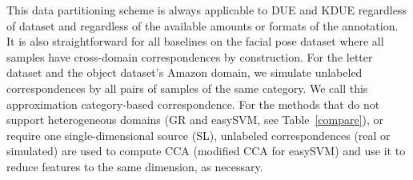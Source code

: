 \documentclass[10pt,twocolumn,letterpaper]{article}
\begin{document}

This data partitioning scheme is always applicable to DUE and KDUE regardless of dataset and regardless of the available amounts or formats of the annotation. It is also straightforward for all baselines on the facial pose dataset where all samples have cross-domain correspondences by construction. For the letter dataset and the object dataset's Amazon domain, we simulate unlabeled correspondences by all pairs of samples of the same category. We call this approximation category-based correspondence. For the methods that do not support heterogeneous domains (GR and easySVM, see Table~\ref{compare}), or require one  single-dimensional source (SL), unlabeled correspondences (real or simulated) are used to compute CCA (modified CCA for easySVM) and use it to reduce features to the same dimension, as necessary.
\end{document}
